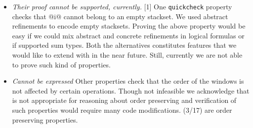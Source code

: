 \begin{itemize}
\item\emph{Their proof cannot be supported, currently.} [1]
One \texttt{quickcheck} property checks 
that @i@ cannot belong to an empty stackset.
%
We used abstract refinements to encode empty stacksets.
%
Proving the above property would be easy 
if we could mix abstract and concrete refinements in logical formulas
or if \toolname supported sum types.
%
Both the alternatives constitutes features that
we would like to extend \toolname with in the near future.
%
Still, currently we are not able to prove such kind of properties.
\item\emph{Cannot be expressed}
Other properties %
check that the order of the windows is not affected by certain operations.
%
Though not infeasible we acknowledge that \toolname 
is not appropriate for reasoning about order preserving
and verification of such properties 
would require many code modifications.
%
(3/17) are order preserving properties.
\end{itemize}
